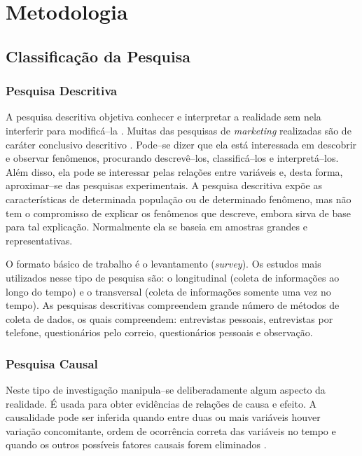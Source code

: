 \chapter{Metodologia}
\label{cap:metodologia}

\section{Classifica\c{c}\~ao da Pesquisa}

\subsection{Pesquisa Descritiva}

A pesquisa descritiva objetiva conhecer e interpretar a realidade sem nela interferir para modific\'a--la \cite{churchill2009marketing}. Muitas das pesquisas de \emph{marketing} realizadas s\~ao de car\'ater conclusivo descritivo \cite{perin2000pesquisa}. Pode--se dizer que ela est\'a interessada em descobrir e observar fen\^omenos, procurando descrev\^e--los, classific\'a--los e interpret\'a--los. Al\'em disso, ela pode se interessar pelas rela\c{c}\~oes entre vari\'aveis e, desta forma, aproximar--se das pesquisas experimentais. A pesquisa descritiva exp\~oe as caracter\'isticas de determinada popula\c{c}\~ao ou de determinado fen\^omeno, mas n\~ao tem o compromisso de explicar os fen\^omenos que descreve, embora sirva de base para tal explica\c{c}\~ao. Normalmente ela se baseia em amostras grandes e representativas. 

O formato b\'asico de trabalho \'e o levantamento (\emph{survey}). Os estudos mais utilizados nesse tipo de pesquisa s\~ao: o longitudinal (coleta de informa\c{c}\~oes ao longo do tempo) e o transversal (coleta de informa\c{c}\~oes somente uma vez no tempo). As pesquisas descritivas compreendem grande n\'umero de m\'etodos de coleta de dados, os quais compreendem: entrevistas pessoais, entrevistas por telefone, question\'arios pelo correio, question\'arios pessoais e observa\c{c}\~ao.

\subsection{Pesquisa Causal}

Neste tipo de investiga\c{c}\~ao manipula--se deliberadamente algum aspecto da realidade. \'E usada para obter evid\^encias de rela\c{c}\~oes de causa e efeito. A causalidade pode ser inferida quando entre duas ou mais vari\'aveis houver varia\c{c}\~ao concomitante, ordem de ocorr\^encia correta das vari\'aveis no tempo e quando os outros poss\'iveis fatores causais forem eliminados \cite{mattar1996pesquisa}.

